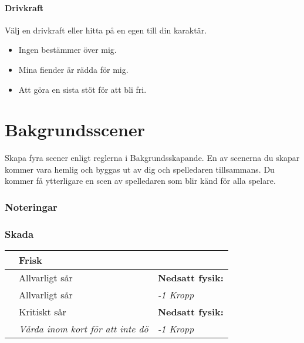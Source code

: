 \subsection{Drivkraft}
Välj en drivkraft eller hitta på en egen till din karaktär.
\begin{itemize}
  \item Ingen bestämmer över mig.
  \item Mina fiender är rädda för mig.
  \item Att göra en sista stöt för att bli fri.
\end{itemize}
\clearpage
\part{Bakgrundsscener}
Skapa fyra scener enligt reglerna i Bakgrundsskapande. En av scenerna du skapar kommer vara hemlig och byggas ut av dig och spelledaren tillsammans. Du kommer få ytterligare en scen av spelledaren som blir känd för alla spelare.


\clearpage
\section*{Noteringar}
\clearpage
\section*{Skada}
\begin{table}[!h]
\begin{tabular}{|c| l l|}
\hline & Frisk & \\
\hline & Allvarligt sår & \textbf{Nedsatt fysik:} \\
& Allvarligt sår &  \textit{-1 Kropp} \\
\hline & Kritiskt sår &  \textbf{Nedsatt fysik:} \\
& \textit{Vårda inom kort för att inte dö} & \textit{-1 Kropp} \\
\hline
\end{tabular}
\end{table}
